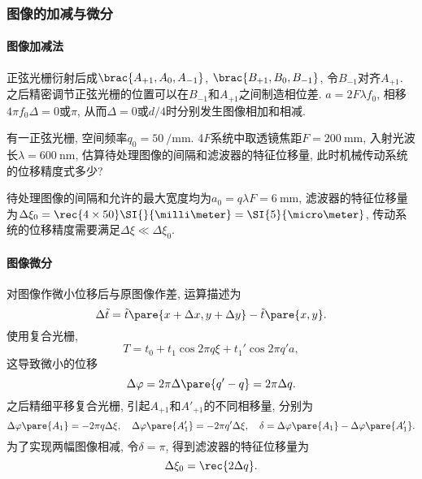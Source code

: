 \documentclass{ctexart}
\begin{document}


\subsubsection{图像的加减与微分} %
\label{ssub:图像的加减与微分}

\paragraph{图像加减法} %
\label{par:图像加减法}

正弦光栅衍射后成$\brac{A_{+1},A_0,A_{-1}}$, $\brac{B_{+1},B_0,B_{-1}}$, 令$B_{-1}$对齐$A_{+1}$. 之后精密调节正弦光栅的位置可以在$B_{-1}$和$A_{+1}$之间制造相位差. $a = 2F\lambda f_0$, 相移$4\pi f_0 \Delta = 0$或$\pi$, 从而$\Delta = 0$或$d/4$时分别发生图像相加和相减.


\begin{sample}
    \begin{ex}
        有一正弦光栅, 空间频率$q_0 = \SI{50}{\per\milli\meter}$. 4$F$系统中取透镜焦距$F=\SI{200}{\milli\meter}$, 入射光波长$\lambda=\SI{600}{\nano\meter}$, 估算待处理图像的间隔和滤波器的特征位移量, 此时机械传动系统的位移精度式多少?
    \end{ex}
    \begin{solution}
        待处理图像的间隔和允许的最大宽度均为$a_0 = q\lambda F = \SI{6}{\milli\meter}$, 滤波器的特征位移量为$\Delta\xi_0 = \rec{4\times 50} \SI{}{\milli\meter} = \SI{5}{\micro\meter}$, 传动系统的位移精度需要满足$\Delta \xi \ll \Delta \xi_0$.
    \end{solution}
\end{sample}

\paragraph{图像微分} %
\label{par:图像微分}

对图像作微小位移后与原图像作差, 运算描述为
\[ \Delta \tilde{t} = \tilde{t}\pare{x+\Delta x, y+\Delta y} - \tilde{t}\pare{x,y}. \]
使用复合光栅,
\[ T = t_0 + t_1 \cos 2\pi q\xi + t_1'\cos 2\pi q' a, \]
这导致微小的位移
\[ \Delta\varphi = 2\pi \Delta\pare{q'-q} = 2\pi \Delta q. \]
之后精细平移复合光栅, 引起$A_{+1}$和$A'_{+1}$的不同相移量, 分别为
\[ \Delta\varphi\pare{A_1} = -2\pi q\Delta\xi,\quad \Delta\varphi\pare{A'_1} = -2\pi q'\Delta \xi,\quad \delta = \Delta\varphi\pare{A_1} - \Delta\varphi\pare{A'_1}. \]
为了实现两幅图像相减, 令$\delta = \pi$, 得到滤波器的特征位移量为
\[ \Delta \xi_0 = \rec{2\Delta q}. \]
\end{document}
